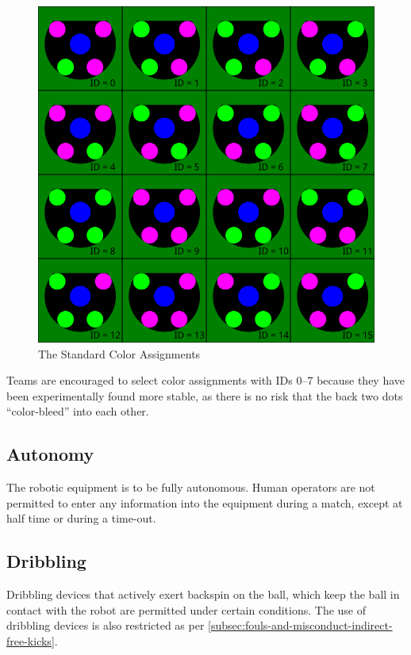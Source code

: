 \begin{figure}[ht] %
	\centering
	\includegraphics[width=0.8\columnwidth]{img/standard_colors2010.png}
	\caption{The Standard Color Assignments}
	\label{fig:stdcolors}
\end{figure}

Teams are encouraged to select color assignments with IDs 0--7 because they have been experimentally found more stable, as there is no risk that the back two dots ``color-bleed'' into each other.

\subsection{Autonomy}
The robotic equipment is to be fully autonomous.
Human operators are not permitted to enter any information into the equipment during a match, except at half time or during a time-out.

\subsection{Dribbling}
Dribbling devices that actively exert backspin on the ball, which keep the ball in contact with the robot are permitted under certain conditions.
The use of dribbling devices is also restricted as per \autoref{subsec:fouls-and-misconduct-indirect-free-kicks}.

